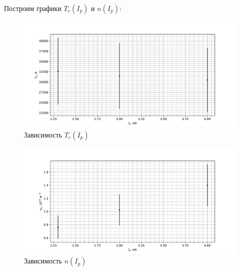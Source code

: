\documentclass[a4paper, 10pt]{article}
\begin{document}

        \newpage
        Построим графики $T_e(I_p)$ и $n(I_p)$:

        \begin{figure}[h!]
        	\centering
        	\includegraphics[width = \textwidth]{t.pdf}
        	\caption{Зависимость $T_e(I_p)$}
        \end{figure}
        \begin{figure}[h!]
        	\centering
        	\includegraphics[width = \textwidth]{n.pdf}
        	\caption{Зависимость $n(I_p)$}
        \end{figure}
\end{document}
